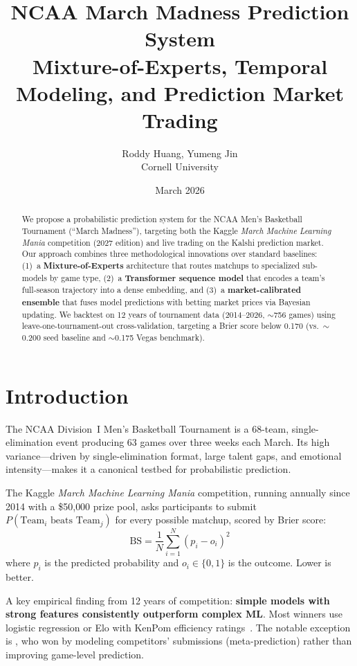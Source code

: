 \documentclass[11pt,a4paper]{article}
\title{%
    \vspace{-1cm}
    {\LARGE\bfseries NCAA March Madness Prediction System}\\[6pt]
    {\large Mixture-of-Experts, Temporal Modeling, and Prediction Market Trading}
}
\author{
    Roddy Huang, Yumeng Jin \\
    Cornell University\\
}
\date{March 2026}
\begin{document}
\maketitle
\thispagestyle{fancy}

\begin{abstract}
We propose a probabilistic prediction system for the NCAA Men's Basketball Tournament (``March Madness''), targeting both the Kaggle \emph{March Machine Learning Mania} competition (2027 edition) and live trading on the Kalshi prediction market. Our approach combines three methodological innovations over standard baselines: (1)~a \textbf{Mixture-of-Experts} architecture that routes matchups to specialized sub-models by game type, (2)~a \textbf{Transformer sequence model} that encodes a team's full-season trajectory into a dense embedding, and (3)~a \textbf{market-calibrated ensemble} that fuses model predictions with betting market prices via Bayesian updating. We backtest on 12 years of tournament data (2014--2026, $\sim$756 games) using leave-one-tournament-out cross-validation, targeting a Brier score below 0.170 (vs.\ $\sim$0.200 seed baseline and $\sim$0.175 Vegas benchmark).
\end{abstract}

\section{Introduction}

The NCAA Division~I Men's Basketball Tournament is a 68-team, single-elimination event producing 63 games over three weeks each March. Its high variance---driven by single-elimination format, large talent gaps, and emotional intensity---makes it a canonical testbed for probabilistic prediction.

The Kaggle \emph{March Machine Learning Mania} competition, running annually since 2014 with a \$50{,}000 prize pool, asks participants to submit $P(\text{Team}_i \text{ beats Team}_j)$ for every possible matchup, scored by Brier score:
\begin{equation}
    \text{BS} = \frac{1}{N}\sum_{i=1}^{N}(p_i - o_i)^2
    \label{eq:brier}
\end{equation}
where $p_i$ is the predicted probability and $o_i \in \{0,1\}$ is the outcome. Lower is better.

A key empirical finding from 12 years of competition: \textbf{simple models with strong features consistently outperform complex ML}. Most winners use logistic regression or Elo with KenPom efficiency ratings~\citep{pomeroy2004}. The notable exception is \citet{landgraf2017}, who won by modeling competitors' submissions (meta-prediction) rather than improving game-level prediction.
\end{document}
